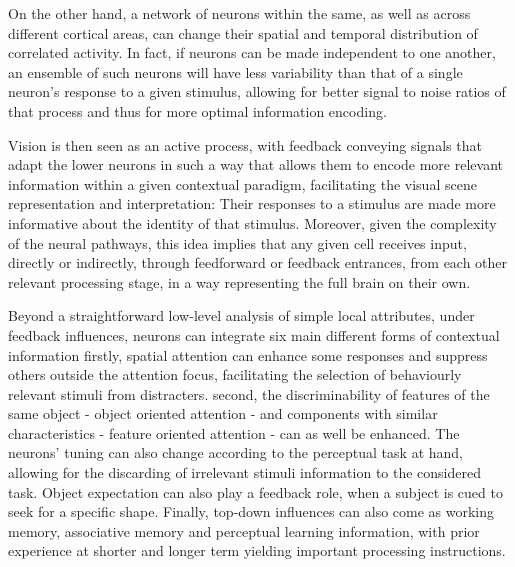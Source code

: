 On the other hand, a network of neurons within the same, as well as across different cortical areas, can change their spatial and temporal distribution of correlated activity. In fact, if neurons can be made independent to one another, an ensemble of such neurons will have less variability than that of a single neuron's response to a given stimulus, allowing for better signal to noise ratios of that process and thus for more optimal information encoding.

Vision is then seen as an active process, with feedback conveying signals that adapt the lower neurons in such a way that allows them to encode more relevant information within a given contextual paradigm, facilitating the visual scene representation and interpretation: Their responses to a stimulus are made more informative about the identity of that stimulus. Moreover, given the complexity of the neural pathways, this idea implies that any given cell receives input, directly or indirectly, through feedforward or feedback entrances, from each other relevant processing stage, in a way representing the full brain on their own.


Beyond a straightforward low-level analysis of simple local attributes, under feedback influences, neurons can integrate six main different forms of contextual information\cite{Gilbert2013} firstly, spatial attention can enhance some responses and suppress others outside the attention focus, facilitating the selection of behaviourly relevant stimuli from distracters. second, the discriminability of features of the same object - object oriented attention - and components with similar characteristics - feature oriented attention - can as well be enhanced. The neurons' tuning can also change according to the perceptual task at hand, allowing for the discarding of irrelevant stimuli information to the considered task. Object expectation can also play a feedback role, when a subject is cued to seek for a specific shape.  Finally, top-down influences can also come as working memory, associative memory and perceptual learning information, with prior experience at shorter and longer term yielding important processing instructions. 

